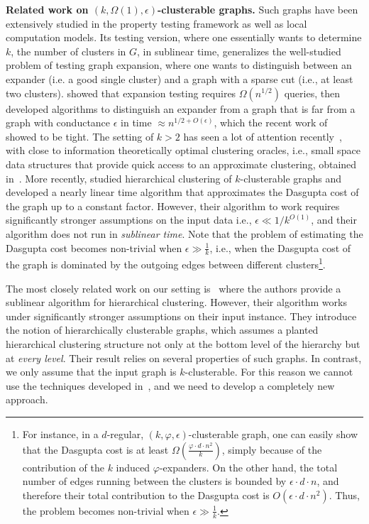 \documentclass[letterpaper,11pt]{article}
\theoremstyle{plain}
\theoremstyle{definition}
\theoremstyle{remark}
\newcommand{\e}{\epsilon}
\begin{document}
{\bf Related work on $(k, \Omega(1), \e)$-clusterable graphs.} Such graphs have been extensively studied in the property testing framework as well as local computation models. Its testing version, where one essentially wants to determine $k$, the number of clusters in $G$, in sublinear time, generalizes the well-studied problem of testing graph
expansion, where one wants to distinguish between an expander (i.e. a good single cluster) and a graph with a sparse cut (i.e., at least two clusters).  \cite{GoldreichR11} showed that expansion testing requires $\Omega(n^{1/2})$ queries, then \cite{CzumajS07,KaleS08,NachmiasS10} developed algorithms to distinguish an expander from a graph that is far from a graph with conductance $\epsilon$ in time $\approx n^{1/2+O(\epsilon)}$, which the recent work of~\cite{chiplunkar2018testing} showed to be tight.
The setting of $k>2$ has seen a lot of attention recently~\cite{CzumajPS15, chiplunkar2018testing,Peng20,GluchKLMS21}, with close to information theoretically optimal clustering oracles, i.e., small space data structures that provide quick access to an approximate clustering, obtained in~\cite{GluchKLMS21}. More recently, \cite{MSun21} studied hierarchical clustering of $k$-clusterable graphs and developed a nearly 
linear time algorithm that approximates the Dasgupta cost of the graph up to a constant factor. However, their algorithm to work requires significantly stronger assumptions on the input data i.e., $\epsilon \ll 1/k^{O(1)}$, and their algorithm does not run in {\em sublinear time}. Note that the problem of estimating the Dasgupta cost becomes non-trivial when $\epsilon\gg \frac{1}{k}$, i.e., when the Dasgupta cost of the graph is dominated by the outgoing 
edges between different clusters\footnote{\label{foot-cost} For instance, in a $d$-regular, $(k, \varphi, \e)$-clusterable graph, one can easily show that the Dasgupta cost is at least $\Omega(\frac{\varphi\cdot d\cdot n^2}{k})$, simply because of the contribution of the $k$ induced $\varphi$-expanders. On the other hand, the total number of edges running between the clusters is bounded by $\e\cdot d\cdot n$, and therefore their total contribution to the Dasgupta cost is $O(\e \cdot d\cdot n^2)$. Thus, the problem becomes non-trivial when $\epsilon\gg \frac{1}{k}$.}.

The most closely related work on our setting is~\cite{KKLM23} where the authors provide a sublinear algorithm for hierarchical clustering. However, their algorithm works under significantly stronger assumptions on their input instance. They introduce the notion of hierarchically clusterable graphs, which assumes a planted hierarchical clustering structure not only at the bottom level of the hierarchy but at \emph{every level}. Their result relies on several properties of such graphs. In contrast, we only assume that the input graph is $k$-clusterable. For this reason we cannot use the techniques developed in~\cite{KKLM23},  and we need to develop a completely new approach.
\end{document}
